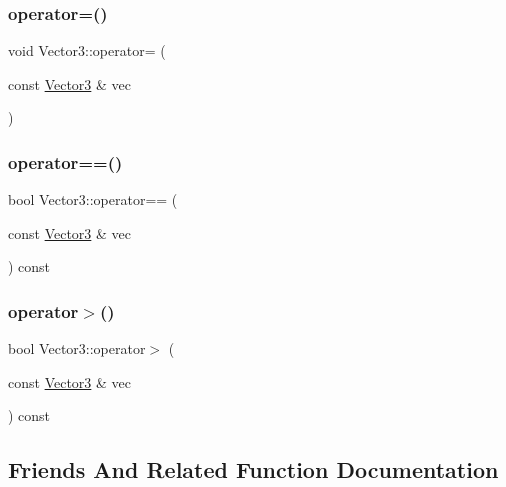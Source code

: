 \mbox{\label{class_vector3_a814c9ffea79062ce4d9ce902da1b6d05}} 
\subsubsection{\texorpdfstring{operator=()}{operator=()}}
{\footnotesize\ttfamily void Vector3\+::operator= (\begin{DoxyParamCaption}\item[{const \hyperlink{class_vector3}{Vector3} \&}]{vec }\end{DoxyParamCaption})\hspace{0.3cm}{\ttfamily [inline]}}

\mbox{\label{class_vector3_aea67111b0bc5b12c341145f84f3e2cff}} 
\subsubsection{\texorpdfstring{operator==()}{operator==()}}
{\footnotesize\ttfamily bool Vector3\+::operator== (\begin{DoxyParamCaption}\item[{const \hyperlink{class_vector3}{Vector3} \&}]{vec }\end{DoxyParamCaption}) const\hspace{0.3cm}{\ttfamily [inline]}}

\mbox{\label{class_vector3_a4c506690133a1c5643734e23e7d69d5d}} 
\subsubsection{\texorpdfstring{operator$>$()}{operator>()}}
{\footnotesize\ttfamily bool Vector3\+::operator$>$ (\begin{DoxyParamCaption}\item[{const \hyperlink{class_vector3}{Vector3} \&}]{vec }\end{DoxyParamCaption}) const\hspace{0.3cm}{\ttfamily [inline]}}



\subsection{Friends And Related Function Documentation}
\mbox{\label{class_vector3_af8071adba02246ed84b6ac3e3f8d4737}} 
